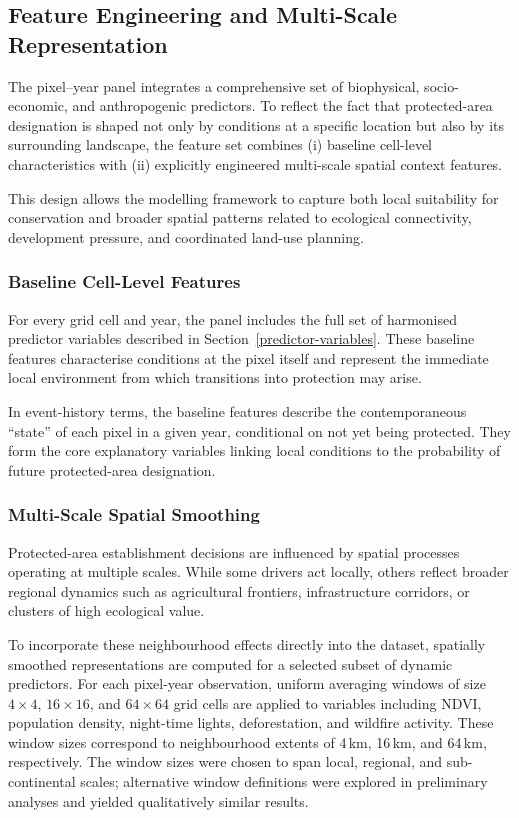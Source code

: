 \documentclass[12pt]{article}
\theoremstyle{break} %
\begin{document}
\subsection{Feature Engineering and Multi-Scale Representation}
\label{features}

The pixel--year panel integrates a comprehensive set of biophysical, socio-economic, and anthropogenic predictors. To reflect the fact that protected-area designation is shaped not only by conditions at a specific location but also by its surrounding landscape, the feature set combines (i) baseline cell-level characteristics with (ii) explicitly engineered multi-scale spatial context features.

This design allows the modelling framework to capture both local suitability for conservation and broader spatial patterns related to ecological connectivity, development pressure, and coordinated land-use planning.

\subsubsection{Baseline Cell-Level Features}
\label{baseline_features}

For every grid cell and year, the panel includes the full set of harmonised predictor variables described in Section~\ref{predictor-variables}. These baseline features characterise conditions at the pixel itself and represent the immediate local environment from which transitions into protection may arise.

In event-history terms, the baseline features describe the contemporaneous ``state'' of each pixel in a given year, conditional on not yet being protected. They form the core explanatory variables linking local conditions to the probability of future protected-area designation.

\subsubsection{Multi-Scale Spatial Smoothing}
\label{scale}

Protected-area establishment decisions are influenced by spatial processes operating at multiple scales. While some drivers act locally, others reflect broader regional dynamics such as agricultural frontiers, infrastructure corridors, or clusters of high ecological value.

To incorporate these neighbourhood effects directly into the dataset, spatially smoothed representations are computed for a selected subset of dynamic predictors. For each pixel-year observation, uniform averaging windows of size $4\times4$, $16\times16$, and $64\times64$ grid cells are applied to variables including NDVI, population density, night-time lights, deforestation, and wildfire activity. These window sizes correspond to neighbourhood extents of 4\,km, 16\,km, and 64\,km, respectively. The window sizes were chosen to span local, regional, and sub-continental scales; alternative window definitions were explored in preliminary analyses and yielded qualitatively similar results.
\end{document}
